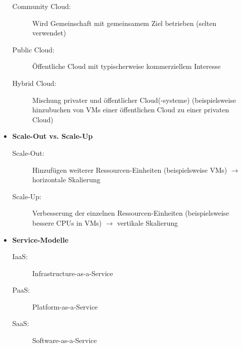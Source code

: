 \begin{itemize}
\begin{description}
		\item[Community Cloud:] Wird Gemeinschaft mit gemeinsamem Ziel betrieben (selten verwendet)
		\item[Public Cloud:] Öffentliche Cloud mit typischerweise kommerziellem Interesse
		\item[Hybrid Cloud:] Mischung privater und öffentlicher Cloud(-systeme) (beispielsweise hinzubuchen von VMs einer öffentlichen Cloud zu einer privaten Cloud)
	\end{description}
	\item \textbf{Scale-Out vs. Scale-Up}
	\begin{description}
		\item[Scale-Out:] Hinzufügen weiterer Ressourcen-Einheiten (beispielsweise VMs) \(\rightarrow\) horizontale Skalierung
		\item[Scale-Up:] Verbesserung der einzelnen Ressourcen-Einheiten (beispielsweise bessere CPUs in VMs) \(\rightarrow\) vertikale Skalierung
	\end{description}
	\item \textbf{Service-Modelle}
	\begin{description}
		\item[IaaS:] Infrastructure-as-a-Service
		\item[PaaS:] Platform-as-a-Service
		\item[SaaS:] Software-as-a-Service
	\end{description}
\end{itemize}


